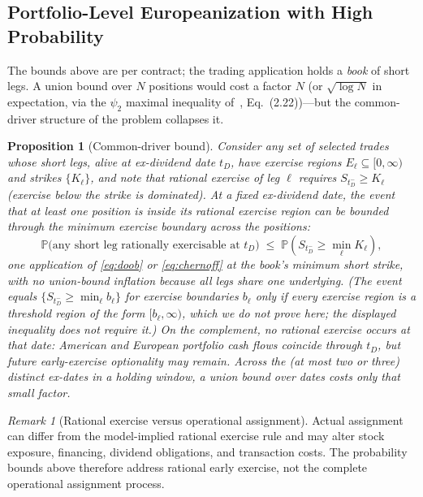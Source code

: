 \documentclass[11pt]{article}
\newtheorem{proposition}{Proposition}
\theoremstyle{remark}
\newtheorem{remark}{Remark}
\newcommand{\Prob}{\mathbb{P}}
\begin{document}
\subsection{Portfolio-Level Europeanization with High Probability}

The bounds above are per contract; the trading application holds a \emph{book} of short legs. A union bound over $N$ positions would cost a factor $N$ (or $\sqrt{\log N}$ in expectation, via the $\psi_2$ maximal inequality of~\cite{vershynin}, Eq.~(2.22))---but the common-driver structure of the problem collapses it.

\begin{proposition}[Common-driver bound]\label{prop:portfolio}
Consider any set of selected trades whose short legs, alive at ex-dividend date $t_D$, have exercise regions $E_\ell\subseteq[0,\infty)$ and strikes $\{K_\ell\}$, and note that rational exercise of leg $\ell$ requires $S_{t_D^-}\ge K_\ell$ (exercise below the strike is dominated). At a fixed ex-dividend date, the event that at least one position is inside its rational exercise region can be bounded through the minimum exercise boundary across the positions:
\[
\Prob\big(\text{any short leg rationally exercisable at } t_D\big)\;\le\;\Prob\!\left(S_{t_D^-}\ge \min_\ell K_\ell\right),
\]
one application of \eqref{eq:doob} or \eqref{eq:chernoff} at the book's minimum short strike, with no union-bound inflation because all legs share one underlying. (The event equals $\{S_{t_D^-}\ge\min_\ell b_\ell\}$ for exercise boundaries $b_\ell$ only if every exercise region is a threshold region of the form $[b_\ell,\infty)$, which we do not prove here; the displayed inequality does not require it.) On the complement, no rational exercise occurs at that date: American and European portfolio cash flows coincide \emph{through} $t_D$, but future early-exercise optionality may remain. Across the (at most two or three) distinct ex-dates in a holding window, a union bound over dates costs only that small factor.
\end{proposition}

\begin{remark}[Rational exercise versus operational assignment]
Actual assignment can differ from the model-implied rational exercise rule and may alter stock exposure, financing, dividend obligations, and transaction costs. The probability bounds above therefore address rational early exercise, not the complete operational assignment process.
\end{remark}
\end{document}
